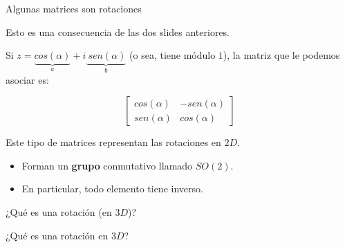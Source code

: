 \documentclass[10pt]{beamer}
\def\R{\mathbb{R}}
\begin{document}
\begin{frame}{Algunas matrices son rotaciones}

Esto es una consecuencia de las dos slides anteriores.

Si $z =  \underbrace{cos(\alpha)}_{a} + i \underbrace{\ sen(\alpha)}_{b}$ (o sea, tiene módulo $1$), la matriz que le podemos asociar es:

\[
\begin{bmatrix}
    cos(\alpha)  &  -sen(\alpha)      \\
    sen(\alpha)  &  cos(\alpha)      
\end{bmatrix}
\] \pause

Este tipo de matrices representan las rotaciones en $2D$.

\begin{itemize}
	\item Forman un \textbf{grupo} conmutativo llamado $SO(2)$.
	\item En particular, todo elemento tiene inverso. %
	
\end{itemize}




\end{frame}

\fi


\begin{frame}{¿Qué es una rotación (en $3D$)?}

	\Huge ¿Qué es una rotación en $3D$?



	
\end{frame}
\end{document}
